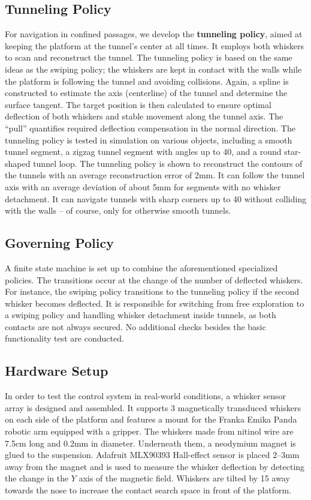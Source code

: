 \subsection{Tunneling Policy}
For navigation in confined passages, we develop the \textbf{tunneling policy}, aimed at keeping the platform at the tunnel's center at all times.
It employs both whiskers to scan and reconstruct the tunnel.
The tunneling policy is based on the same ideas as the swiping policy; the whiskers are kept in contact with the walls while the platform is following the tunnel and avoiding collisions.
Again, a spline is constructed to estimate the axis (centerline) of the tunnel and determine the surface tangent.
The target position is then calculated to ensure optimal deflection of both whiskers and stable movement along the tunnel axis.
The \enquote{pull} quantifies required deflection compensation in the normal direction.
The tunneling policy is tested in simulation on various objects, including a smooth tunnel segment, a zigzag tunnel segment with angles up to 40\degree{}, and a round star-shaped tunnel loop.
The tunneling policy is shown to reconstruct the contours of the tunnels with an average reconstruction error of 2mm.
It can follow the tunnel axis with an average deviation of about 5mm for segments with no whisker detachment.
It can navigate tunnels with sharp corners up to 40\degree{} without colliding with the walls -- of course, only for otherwise smooth tunnels.

\subsection{Governing Policy}
A finite state machine is set up to combine the aforementioned specialized policies.
The transitions occur at the change of the number of deflected whiskers.
For instance, the swiping policy transitions to the tunneling policy if the second whisker becomes deflected.
It is responsible for switching from free exploration to a swiping policy and handling whisker detachment inside tunnels, as both contacts are not always secured.
No additional checks besides the basic functionality test are conducted.

\subsection{Hardware Setup}
In order to test the control system in real-world conditions, a whisker sensor array is designed and assembled.
It supports 3 magnetically transduced whiskers on each side of the platform and features a mount for the Franka Emika Panda robotic arm equipped with a gripper.
The whiskers made from nitinol wire are 7.5cm long and 0.2mm in diameter.
Underneath them, a neodymium magnet is glued to the suspension.
Adafruit MLX90393 Hall-effect sensor is placed 2--3mm away from the magnet and is used to measure the whisker deflection by detecting the change in the $Y$ axis of the magnetic field.
Whiskers are tilted by 15\degree{} away towards the nose to increase the contact search space in front of the platform.


